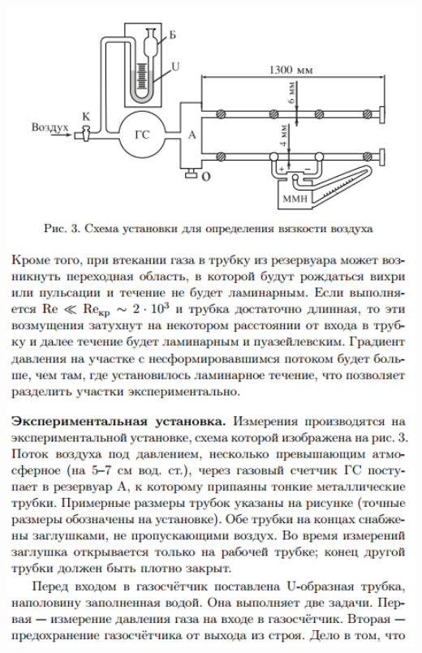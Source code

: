 \documentclass[12pt]{article}
\begin{document}
\begin{center}
    	\includegraphics[width=16cm]{theory_6.png}

\end{center}
\end{document}
